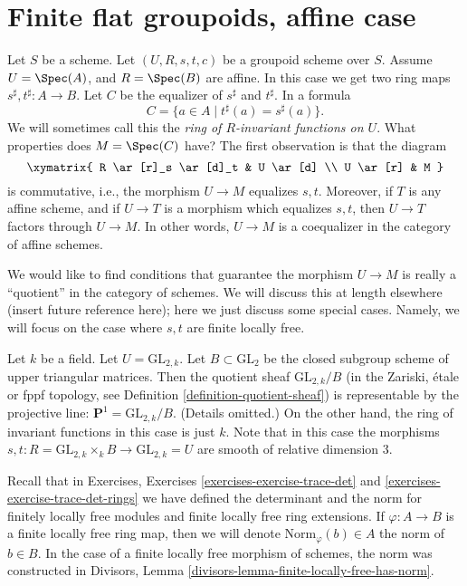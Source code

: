 \section{Finite flat groupoids, affine case}
\label{section-finite-flat}

\noindent
Let $S$ be a scheme.
Let $(U, R, s, t, c)$ be a groupoid scheme over $S$.
Assume $U = \Spec(A)$, and $R = \Spec(B)$ are affine.
In this case we get two ring maps
$s^\sharp, t^\sharp : A \longrightarrow B$.
Let $C$ be the equalizer of $s^\sharp$ and $t^\sharp$. In a formula
\begin{equation}
\label{equation-invariants}
C = \{a \in A \mid t^\sharp(a) = s^\sharp(a) \}.
\end{equation}
We will sometimes call this the {\it ring of $R$-invariant functions on $U$}.
What properties does $M = \Spec(C)$ have? The first observation is
that the diagram
$$
\xymatrix{
R \ar[r]_s \ar[d]_t & U \ar[d] \\
U \ar[r] & M
}
$$
is commutative, i.e., the morphism $U \to M$ equalizes $s, t$.
Moreover, if $T$ is any affine scheme, and if $U \to T$ is
a morphism which equalizes $s, t$, then $U \to T$ factors through $U \to M$.
In other words, $U \to M$ is a coequalizer in the category of affine schemes.

\medskip\noindent
We would like to find conditions that guarantee the morphism $U \to M$ is
really a ``quotient'' in the category of schemes. We will discuss this at
length elsewhere (insert future reference here); here we just discuss some
special cases. Namely, we will focus on the case where $s, t$ are finite
locally free.

\begin{example}
\label{example-quotient-projective-line}
Let $k$ be a field. Let $U = \text{GL}_{2, k}$. Let $B \subset \text{GL}_2$
be the closed subgroup scheme of upper triangular matrices.
Then the quotient sheaf $\text{GL}_{2, k}/B$ (in the Zariski, \'etale or
fppf topology, see Definition \ref{definition-quotient-sheaf}) is
representable by the projective line: $\mathbf{P}^1 = \text{GL}_{2, k}/B$.
(Details omitted.)
On the other hand, the ring of invariant functions in this case is just $k$.
Note that in this case the morphisms
$s, t : R = \text{GL}_{2, k} \times_k B \to \text{GL}_{2, k} = U$ are smooth
of relative dimension $3$.
\end{example}

\noindent
Recall that in Exercises, Exercises \ref{exercises-exercise-trace-det} and
\ref{exercises-exercise-trace-det-rings} we have defined the determinant
and the norm for finitely locally free modules and finite locally free ring
extensions. If $\varphi : A \to B$ is a finite locally free ring map, then
we will denote $\text{Norm}_\varphi(b) \in A$ the norm of $b \in B$. In the
case of a finite locally free morphism of schemes, the norm was constructed
in Divisors, Lemma \ref{divisors-lemma-finite-locally-free-has-norm}.

